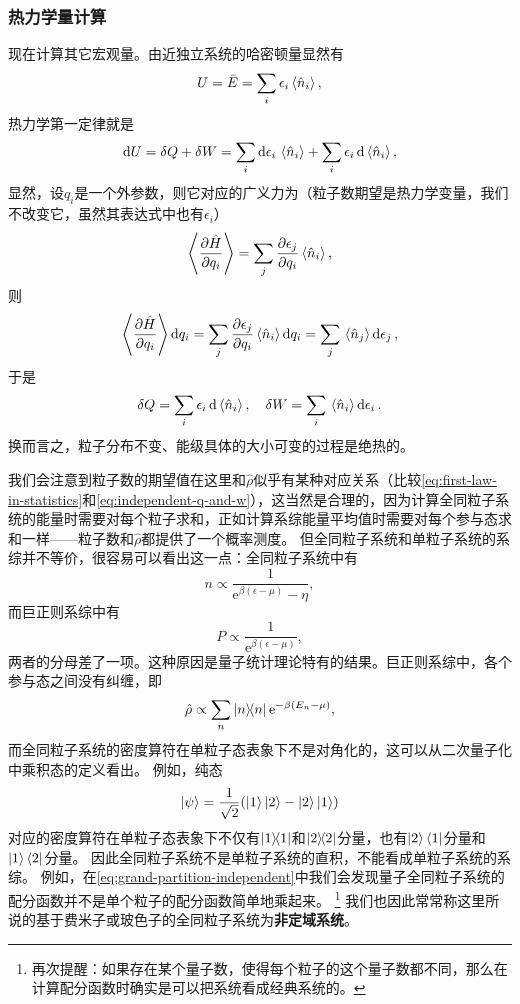 \documentclass[hyperref, UTF8, a4paper]{ctexart}
\newcommand*{\ee}{\mathrm{e}}
\begin{document}
\subsubsection{热力学量计算}

现在计算其它宏观量。由近独立系统的哈密顿量显然有
\begin{equation}
    U = \bar{E} = \sum_i \epsilon_i \expval*{\hat{n}_i},
\end{equation}
热力学第一定律就是
\[
    \dd{U} = \var{Q} + \var{W} = \sum_i \dd{\epsilon_i} \expval*{\hat{n}_i} + \sum_i \epsilon_i \dd{\expval*{\hat{n}_i}},
\]
显然，设$q_i$是一个外参数，则它对应的广义力为（粒子数期望是热力学变量，我们不改变它，虽然其表达式中也有$\epsilon_i$）
\[
    \expval{\pdv{\hat{H}}{q_i}} = \sum_j \pdv{\epsilon_j}{q_i} \expval*{\hat{n}_i},
\]
则
\[
    \expval{\pdv{\hat{H}}{q_i}} \dd{q_i} = \sum_j \pdv{\epsilon_j}{q_i} \expval*{\hat{n}_i} \dd{q_i} = \sum_j \expval*{\hat{n}_j} \dd{\epsilon_j},
\]
于是
\begin{equation}
    \var{Q} = \sum_i \epsilon_i \dd{\expval*{\hat{n}_i}}, \quad \var{W} = \sum_i \expval*{\hat{n}_i} \dd{\epsilon_i}.
    \label{eq:independent-q-and-w}
\end{equation}
换而言之，粒子分布不变、能级具体的大小可变的过程是绝热的。

我们会注意到粒子数的期望值在这里和$\hat{\rho}$似乎有某种对应关系（比较\eqref{eq:first-law-in-statistics}和\eqref{eq:independent-q-and-w}），这当然是合理的，因为计算全同粒子系统的能量时需要对每个粒子求和，正如计算系综能量平均值时需要对每个参与态求和一样——粒子数和$\hat{\rho}$都提供了一个概率测度。
但全同粒子系统和单粒子系统的系综并不等价，很容易可以看出这一点：全同粒子系统中有
\[
    n \propto \frac{1}{\ee^{\beta (\epsilon - \mu)} - \eta},
\]
而巨正则系综中有
\[
    P \propto \frac{1}{\ee^{\beta (\epsilon - \mu)}},
\]
两者的分母差了一项。这种原因是量子统计理论特有的结果。巨正则系综中，各个参与态之间没有纠缠，即
\[
    \hat{\rho} \propto \sum_n \dyad{n} \ee^{- \beta (E_n - \mu)},
\]
而全同粒子系统的密度算符在单粒子态表象下不是对角化的，这可以从二次量子化中乘积态的定义看出。
例如，纯态
\[
    \ket{\psi} = \frac{1}{\sqrt{2}} (\ket{1} \ket{2} - \ket{2} \ket{1})
\]
对应的密度算符在单粒子态表象下不仅有$\dyad{1}$和$\dyad{2}$分量，也有$\ket{2}\bra{1}$分量和$\ket{1}\bra{2}$分量。
因此全同粒子系统不是单粒子系统的直积，不能看成单粒子系统的系综。
例如，在\eqref{eq:grand-partition-independent}中我们会发现量子全同粒子系统的配分函数并不是单个粒子的配分函数简单地乘起来。%
\footnote{再次提醒：如果存在某个量子数，使得每个粒子的这个量子数都不同，那么在计算配分函数时确实是可以把系统看成经典系统的。}%
我们也因此常常称这里所说的基于费米子或玻色子的全同粒子系统为\textbf{非定域系统}。
\end{document}
